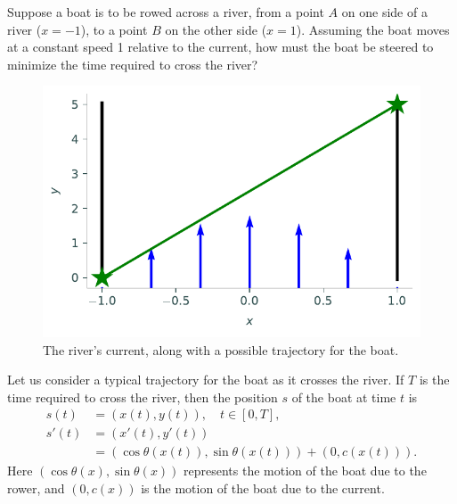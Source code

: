 \label{lab:rivercrossing}

Suppose a boat is to be rowed across a river, from a point $A$ on one side of a river ($x=-1$), to a point $B$ on the other side ($x=1$). 
Assuming the boat moves at a constant speed 1 relative to the current, how must the boat be steered to minimize the time required to cross the river? 

\begin{figure}
\centering
\includegraphics[width=\textwidth]{figures/rivercurrent.pdf}
\caption{The river's current, along with a possible trajectory for the boat.}
\label{fig:rivercrossing_current}
\end{figure}


Let us consider a typical trajectory for the boat as it crosses the river. 
If $T$ is the time required to cross the river, then the position $s$ of the boat at time $t$ is
\begin{align*}
	s(t) &= (x(t), y(t)), \quad t \in [0,T], \\
	s'(t) &= (x'(t), y'(t)) \\ 
	&= (\cos \theta(x(t)),\sin \theta(x(t))) + (0, c(x(t))).
\end{align*}
Here $(\cos \theta(x), \sin \theta(x))$ represents the motion of the boat due to the rower, and $(0, c(x))$ is the motion of the boat due to the current.

